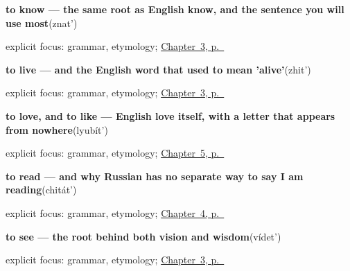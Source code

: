 \noindent\begin{minipage}[t]{\linewidth}
\raggedright
\textbf{to know — the same root as English know, and the sentence you will use most}\enspace\emph{}\enspace(znat')\par
\footnotesize explicit focus: grammar, etymology; \hyperref[ch:russian-first-verbs]{Chapter~3, p.~\pageref*{ch:russian-first-verbs}}
\end{minipage}\par\smallskip

\noindent\begin{minipage}[t]{\linewidth}
\raggedright
\textbf{to live — and the English word that used to mean 'alive'}\enspace\emph{}\enspace(zhit')\par
\footnotesize explicit focus: grammar, etymology; \hyperref[ch:russian-first-verbs]{Chapter~3, p.~\pageref*{ch:russian-first-verbs}}
\end{minipage}\par\smallskip

\noindent\begin{minipage}[t]{\linewidth}
\raggedright
\textbf{to love, and to like — English love itself, with a letter that appears from nowhere}\enspace\emph{}\enspace(lyubít')\par
\footnotesize explicit focus: grammar, etymology; \hyperref[ch:russian-verbs-of-the-hand]{Chapter~5, p.~\pageref*{ch:russian-verbs-of-the-hand}}
\end{minipage}\par\smallskip

\noindent\begin{minipage}[t]{\linewidth}
\raggedright
\textbf{to read — and why Russian has no separate way to say I am reading}\enspace\emph{}\enspace(chitát')\par
\footnotesize explicit focus: grammar, etymology; \hyperref[ch:russian-verbs-of-the-mind]{Chapter~4, p.~\pageref*{ch:russian-verbs-of-the-mind}}
\end{minipage}\par\smallskip

\noindent\begin{minipage}[t]{\linewidth}
\raggedright
\textbf{to see — the root behind both vision and wisdom}\enspace\emph{}\enspace(vídet')\par
\footnotesize explicit focus: grammar, etymology; \hyperref[ch:russian-first-verbs]{Chapter~3, p.~\pageref*{ch:russian-first-verbs}}
\end{minipage}\par\smallskip

